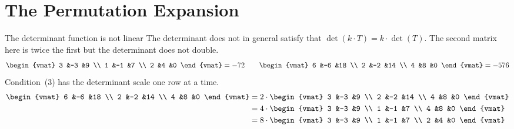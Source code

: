 \documentclass[10pt,t]{beamer}
\begin{document}
\section{The Permutation Expansion}

\begin{frame}{The determinant function is not linear}
\ex
The determinant does not in general satisfy that 
$\det(k\cdot T)=k\cdot\det(T)$.
The second matrix here is twice the first
but the determinant does not double.
\begin{equation*}
  \begin{vmat}
    3  &-3  &9 \\
    1  &-1   &7 \\
    2  &4   &0
  \end{vmat}
  =-72
  \qquad
  \begin{vmat}
    6  &-6  &18 \\
    2  &-2   &14 \\
    4  &8   &0
  \end{vmat}
  =-576
\end{equation*}
Condition~(3) %
has the determinant scale one row at a time.   
\begin{align*}
  \begin{vmat}
    6  &-6  &18 \\
    2  &-2   &14 \\
    4  &8   &0
  \end{vmat}
  &=2\cdot
  \begin{vmat}
    3  &-3  &9 \\
    2  &-2   &14 \\
    4  &8   &0
  \end{vmat}           \\
  &=4\cdot
  \begin{vmat}
    3  &-3  &9 \\
    1  &-1   &7 \\
    4  &8   &0
  \end{vmat}           \\
  &=8\cdot
  \begin{vmat}
    3  &-3  &9 \\
    1  &-1   &7 \\
    2  &4   &0
  \end{vmat}         
\end{align*}
\end{frame}
\end{document}
